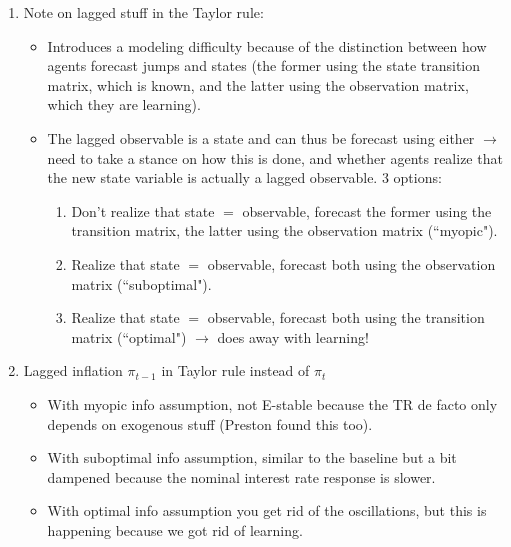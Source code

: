 \documentclass[11pt]{article}
\renewcommand{\[}{\begin{equation}}
\renewcommand{\]}{\end{equation}}
\begin{document}
\begin{enumerate}
\begin{enumerate}
\item Note on lagged stuff in the Taylor rule:
\begin{itemize}
\item Introduces a modeling difficulty because of the distinction between how agents forecast jumps and states (the former using the state transition matrix, which is known, and the latter using the observation matrix, which they are learning).
\item The lagged observable is a state and can thus be forecast using either $\rightarrow$ need to take a stance on how this is done, and whether agents realize that the new state variable is actually a lagged observable. 3 options:
\begin{enumerate}
\item Don't realize that state $=$ observable, forecast the former using the transition matrix, the latter using the observation matrix (``myopic").
\item Realize that state $=$ observable, forecast both using the observation matrix (``suboptimal").
\item Realize that state $=$ observable, forecast both using the transition matrix (``optimal") $\rightarrow$ does away with learning!
\end{enumerate}

\end{itemize}
\item Lagged inflation $\pi_{t-1}$ in Taylor rule instead of $\pi_t$
\begin{itemize}
\item With myopic info assumption, not E-stable because the TR de facto only depends on exogenous stuff (Preston found this too).
\item With suboptimal info assumption, similar to the baseline but a bit dampened because the nominal interest rate response is slower.
\item With optimal info assumption you get rid of the oscillations, but this is happening because we got rid of learning.
\end{itemize}


\end{enumerate}
\end{enumerate}
\end{document}
